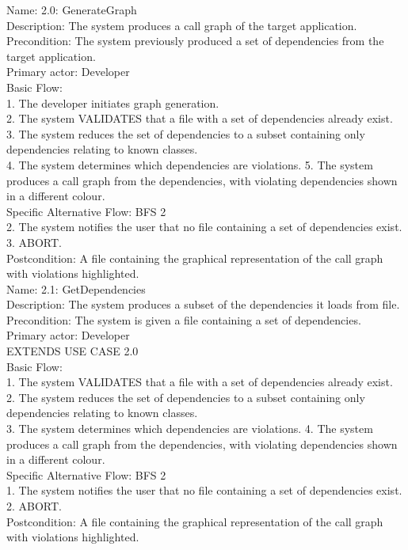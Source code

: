 \noindent Name: 2.0: GenerateGraph\\
Description: The system produces a call graph of the target application.\\
Precondition: The system previously produced a set of dependencies from the target application.\\
Primary actor: Developer\\
Basic Flow:\\
1. The developer initiates graph generation.\\
2. The system VALIDATES that a file with a set of dependencies already exist.\\
3. The system reduces the set of dependencies to a subset containing only dependencies relating to known classes.\\
4. The system determines which dependencies are violations.
5. The system produces a call graph from the dependencies, with violating dependencies shown in a different colour.\\
Specific Alternative Flow: BFS 2\\
2. The system notifies the user that no file containing a set of dependencies exist.\\
3. ABORT.\\
Postcondition: A file containing the graphical representation of the call graph with violations highlighted.\\

\noindent Name: 2.1: GetDependencies\\
Description: The system produces a subset of the dependencies it loads from file.\\
Precondition: The system is given a file containing a set of dependencies.\\
Primary actor: Developer\\
EXTENDS USE CASE 2.0\\
Basic Flow:\\
1. The system VALIDATES that a file with a set of dependencies already exist.\\
2. The system reduces the set of dependencies to a subset containing only dependencies relating to known classes.\\
3. The system determines which dependencies are violations.
4. The system produces a call graph from the dependencies, with violating dependencies shown in a different colour.\\
Specific Alternative Flow: BFS 2\\
1. The system notifies the user that no file containing a set of dependencies exist.\\
2. ABORT.\\
Postcondition: A file containing the graphical representation of the call graph with violations highlighted.\\

